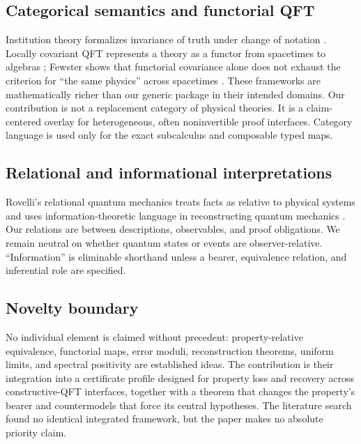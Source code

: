 \subsection{Categorical semantics and functorial QFT}

Institution theory formalizes invariance of truth under change of notation
\cite{GoguenBurstall1992}.  Locally covariant QFT represents a theory as a
functor from spacetimes to algebras
\cite{BrunettiFredenhagenVerch2003}; Fewster shows that functorial covariance
alone does not exhaust the criterion for ``the same physics'' across
spacetimes \cite{Fewster2015}.  These frameworks are mathematically richer
than our generic package in their intended domains.  Our contribution is not
a replacement category of physical theories.  It is a claim-centered overlay
for heterogeneous, often noninvertible proof interfaces.  Category language
is used only for the exact subcalculus and composable typed maps.

\subsection{Relational and informational interpretations}

Rovelli's relational quantum mechanics treats facts as relative to physical
systems and uses information-theoretic language in reconstructing quantum
mechanics \cite{Rovelli1996}.  Our relations are between descriptions,
observables, and proof obligations.  We remain neutral on whether quantum
states or events are observer-relative.  ``Information'' is eliminable
shorthand unless a bearer, equivalence relation, and inferential role are
specified.

\subsection{Novelty boundary}

No individual element is claimed without precedent: property-relative
equivalence, functorial maps, error moduli, reconstruction theorems, uniform
limits, and spectral positivity are established ideas.  The contribution is
their integration into a certificate profile designed for property loss and
recovery across constructive-QFT interfaces, together with a theorem that
changes the property's bearer and countermodels that force its central
hypotheses.  The literature search found no identical integrated framework,
but the paper makes no absolute priority claim.
